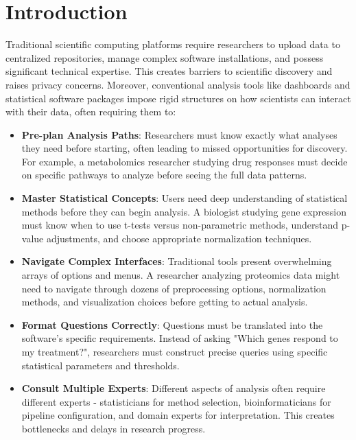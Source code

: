 \documentclass[11pt,a4paper]{article}
\begin{document}
\section{Introduction}
Traditional scientific computing platforms require researchers to upload data to centralized repositories, manage complex software installations, and possess significant technical expertise. This creates barriers to scientific discovery and raises privacy concerns. Moreover, conventional analysis tools like dashboards and statistical software packages impose rigid structures on how scientists can interact with their data, often requiring them to:
\begin{itemize}
    \item \textbf{Pre-plan Analysis Paths}: Researchers must know exactly what analyses they need before starting, often leading to missed opportunities for discovery. For example, a metabolomics researcher studying drug responses must decide on specific pathways to analyze before seeing the full data patterns.
    
    \item \textbf{Master Statistical Concepts}: Users need deep understanding of statistical methods before they can begin analysis. A biologist studying gene expression must know when to use t-tests versus non-parametric methods, understand p-value adjustments, and choose appropriate normalization techniques.
    
    \item \textbf{Navigate Complex Interfaces}: Traditional tools present overwhelming arrays of options and menus. A researcher analyzing proteomics data might need to navigate through dozens of preprocessing options, normalization methods, and visualization choices before getting to actual analysis.
    
    \item \textbf{Format Questions Correctly}: Questions must be translated into the software's specific requirements. Instead of asking "Which genes respond to my treatment?", researchers must construct precise queries using specific statistical parameters and thresholds.
    
    \item \textbf{Consult Multiple Experts}: Different aspects of analysis often require different experts - statisticians for method selection, bioinformaticians for pipeline configuration, and domain experts for interpretation. This creates bottlenecks and delays in research progress.
\end{itemize}
\end{document}
